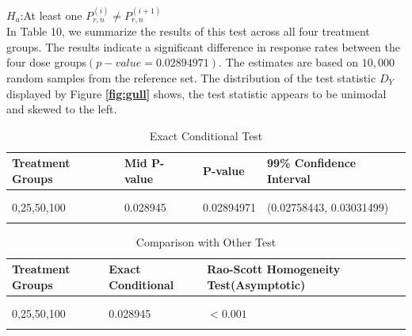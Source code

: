 \documentclass[12pt,oneside]{report}
\theoremstyle{definition}
\theoremstyle{mystyle}
\begin{document}
$H_{a}$:At least one $P^{(i)}_{r,n} \neq P^{(i+1)}_{r,n}$  \hspace{5mm} \\


In Table 10, we summarize the results
of this test  across all four treatment groups. The results indicate a significant difference in response rates between the four dose groups$(p-value=0.02894971)$. The estimates are based on  $10,000$ random samples from the reference set. The distribution of the test statistic $D_{Y}$ displayed by Figure \textbf{\ref{fig:gull}} shows, the test statistic appears to be unimodal and skewed to the left.\\
\begin{table}[h!]
	\label{table:homo}
	\begin{center}
		\caption{Exact Conditional Test}
		\begin{tabular}{ l l l l}
			\hline
			Treatment Groups &Mid P-value &\hspace{5mm} P-value& \hspace{5mm}99\% Confidence Interval \\ \hline\hline
			&\\
			&\\
			0,25,50,100 & 0.028945 &\hspace{5mm}  0.02894971 &\hspace{5mm}(0.02758443, 0.03031499)\\
			&\\
			\hline
		\end{tabular}
	\end{center}
\end{table}	
\vspace{7mm}

\begin{table}[h!]
	\label{table:rao}
	\begin{center}
		\caption{Comparison with Other Test}
		\begin{tabular}{ l l l l}
			\hline
			Treatment Groups &Exact Conditional &\hspace{5mm} Rao-Scott Homogeneity Test(Asymptotic)&  \\ \hline\hline
			&\\
			&\\
			0,25,50,100 & 0.028945 &\hspace{5mm} $<0.001$ &\\
			&\\
			\hline
		\end{tabular}
	\end{center}
\end{table}	
\end{document}
